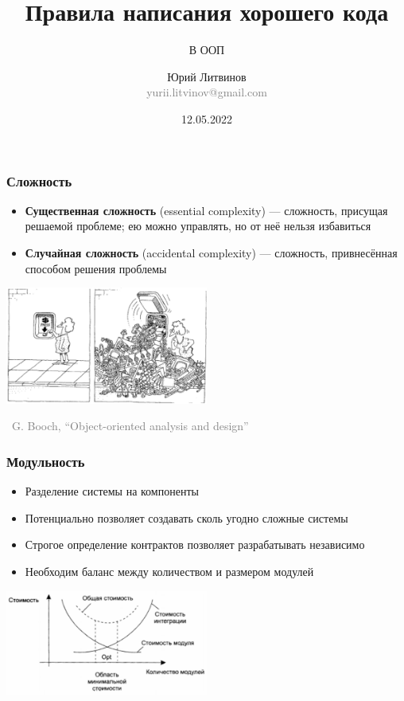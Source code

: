 \documentclass[xetex,mathserif,serif]{beamer}
\title{Правила написания хорошего кода}
\subtitle{В ООП}
\author[Юрий Литвинов]{Юрий Литвинов\\\small{\textcolor{gray}{yurii.litvinov@gmail.com}}}
\date{12.05.2022}
\newcommand{\attribution}[1] {
\vspace{-5mm}\begin{flushright}\begin{scriptsize}\textcolor{gray}{\textcopyright\, #1}\end{scriptsize}\end{flushright}
}
\begin{document}
	\frame{\titlepage}

	\begin{frame}
		\frametitle{Сложность}
		\begin{itemize}
			\item \textbf{Существенная сложность} (essential complexity) --- сложность, присущая решаемой проблеме; ею можно управлять, но от неё нельзя избавиться
			\item \textbf{Случайная сложность} (accidental complexity) --- сложность, привнесённая способом решения проблемы
		\end{itemize}
		\vskip 0.5cm
		\begin{center}
			\includegraphics[width=0.5\textwidth]{complexityHiding.png}
		\end{center}
		\attribution{G. Booch, ``Object-oriented analysis and design''}
	\end{frame}

	\begin{frame}
		\frametitle{Модульность}
		\begin{itemize}
			\item Разделение системы на компоненты
			\item Потенциально позволяет создавать сколь угодно сложные системы
			\item Строгое определение контрактов позволяет разрабатывать независимо
			\item Необходим баланс между количеством и размером модулей
		\end{itemize}
		\vskip 1cm
		\begin{center}
			\includegraphics[width=0.5\textwidth]{modulesCost.png}
		\end{center}
	\end{frame}
\end{document}
